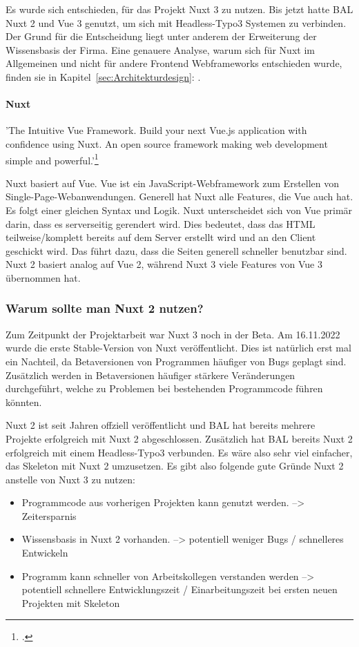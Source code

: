 Es wurde sich entschieden, für das Projekt Nuxt 3 zu nutzen. Bis jetzt hatte \acs{BAL} Nuxt 2 und Vue 3 genutzt, um sich mit Headless-Typo3 Systemen zu verbinden. Der Grund für die Entscheidung liegt unter anderem der Erweiterung der Wissensbasis der Firma. Eine genauere Analyse, warum sich für Nuxt im Allgemeinen und nicht für andere Frontend Webframeworks entschieden wurde, finden sie in Kapitel~\ref{sec:Architekturdesign}: .

\paragraph{Nuxt}

'The Intuitive Vue
Framework. Build your next Vue.js application with confidence using Nuxt. An open source framework making web development simple and powerful.'\footnote{\Vgl \citet{Nuxt}.} 

Nuxt basiert auf Vue. Vue ist ein JavaScript-Webframework zum Erstellen von Single-Page-Webanwendungen. Generell hat Nuxt alle Features, die Vue auch hat. Es folgt einer gleichen Syntax und Logik. Nuxt unterscheidet sich von Vue primär darin, dass es serverseitig gerendert wird. Dies bedeutet, dass das HTML teilweise/komplett bereits auf dem Server erstellt wird und an den Client geschickt wird. Das führt dazu, dass die Seiten generell schneller benutzbar sind. Nuxt 2 basiert analog auf Vue 2, während Nuxt 3 viele Features von Vue 3 übernommen hat.

\subsubsection{Warum sollte man Nuxt 2 nutzen?}
\label{sec:Warum sollte man Nuxt 2 nutzen?}

Zum Zeitpunkt der Projektarbeit war Nuxt 3 noch in der Beta. Am 16.11.2022 wurde die erste Stable-Version von Nuxt veröffentlicht. Dies ist natürlich erst mal ein Nachteil, da Betaversionen von Programmen häufiger von Bugs geplagt sind. Zusätzlich werden in Betaversionen häufiger stärkere Veränderungen durchgeführt, welche zu Problemen bei bestehenden Programmcode führen könnten. 

Nuxt 2 ist seit Jahren offziell veröffentlicht und \acs{BAL} hat bereits mehrere Projekte erfolgreich mit Nuxt 2 abgeschlossen. Zusätzlich hat \acs{BAL} bereits Nuxt 2 erfolgreich mit einem Headless-Typo3 verbunden. Es wäre also sehr viel einfacher, das Skeleton mit Nuxt 2 umzusetzen. Es gibt also folgende gute Gründe Nuxt 2 anstelle von Nuxt 3 zu nutzen:
\begin{itemize}
	\item Programmcode aus vorherigen Projekten kann genutzt werden. --> Zeitersparnis
	\item Wissensbasis in Nuxt 2 vorhanden. --> potentiell weniger Bugs / schnelleres Entwickeln
	\item Programm kann schneller von Arbeitskollegen verstanden werden --> potentiell schnellere Entwicklungszeit / Einarbeitungszeit bei ersten neuen Projekten mit Skeleton
\end{itemize}


